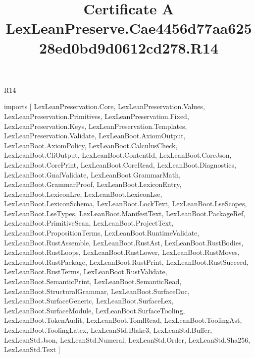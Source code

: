 \begin{lexlean}{R14}
\title{Certificate A LexLeanPreserve.Cae4456d77aa62528ed0bd9d0612cd278.R14}
\begin{coremodule}
imports [
  LexLeanPreservation.Core,
  LexLeanPreservation.Values,
  LexLeanPreservation.Primitives,
  LexLeanPreservation.Fixed,
  LexLeanPreservation.Keys,
  LexLeanPreservation.Templates,
  LexLeanPreservation.Validate,
  LexLeanBoot.AxiomOutput,
  LexLeanBoot.AxiomPolicy,
  LexLeanBoot.CalculusCheck,
  LexLeanBoot.CliOutput,
  LexLeanBoot.ContentId,
  LexLeanBoot.CoreJson,
  LexLeanBoot.CorePrint,
  LexLeanBoot.CoreRead,
  LexLeanBoot.Diagnostics,
  LexLeanBoot.GnafValidate,
  LexLeanBoot.GrammarMath,
  LexLeanBoot.GrammarProof,
  LexLeanBoot.LexiconEntry,
  LexLeanBoot.LexiconLre,
  LexLeanBoot.LexiconLse,
  LexLeanBoot.LexiconSchema,
  LexLeanBoot.LockText,
  LexLeanBoot.LseScopes,
  LexLeanBoot.LseTypes,
  LexLeanBoot.ManifestText,
  LexLeanBoot.PackageRef,
  LexLeanBoot.PrimitiveScan,
  LexLeanBoot.ProjectText,
  LexLeanBoot.PropositionTerms,
  LexLeanBoot.RuntimeValidate,
  LexLeanBoot.RustAssemble,
  LexLeanBoot.RustAst,
  LexLeanBoot.RustBodies,
  LexLeanBoot.RustLoops,
  LexLeanBoot.RustLower,
  LexLeanBoot.RustMoves,
  LexLeanBoot.RustPackage,
  LexLeanBoot.RustPrint,
  LexLeanBoot.RustSucceed,
  LexLeanBoot.RustTerms,
  LexLeanBoot.RustValidate,
  LexLeanBoot.SemanticPrint,
  LexLeanBoot.SemanticRead,
  LexLeanBoot.StructuralGrammar,
  LexLeanBoot.SurfaceDoc,
  LexLeanBoot.SurfaceGeneric,
  LexLeanBoot.SurfaceLex,
  LexLeanBoot.SurfaceModule,
  LexLeanBoot.SurfaceTooling,
  LexLeanBoot.TokenAudit,
  LexLeanBoot.TomlRead,
  LexLeanBoot.ToolingAst,
  LexLeanBoot.ToolingLatex,
  LexLeanStd.Blake3,
  LexLeanStd.Buffer,
  LexLeanStd.Json,
  LexLeanStd.Numeral,
  LexLeanStd.Order,
  LexLeanStd.Sha256,
  LexLeanStd.Text
]


\end{coremodule}
\end{lexlean}
